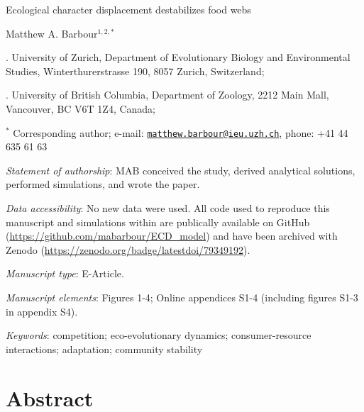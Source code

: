 \documentclass[11pt,]{article}
\author{}
\date{\vspace{-2.5em}}
\begin{document}
\vspace*{0.1cm}

\begin{center} \LARGE Ecological character displacement destabilizes food webs \end{center}

\bigskip 

\begin{center} \large Matthew A. Barbour$^{1,2,\ast}$ \normalsize \end{center}

\bigskip

. University of Zurich, Department of Evolutionary Biology
and Environmental Studies, Winterthurerstrasse 190, 8057 Zurich,
Switzerland;

. University of British Columbia, Department of Zoology, 2212
Main Mall, Vancouver, BC V6T 1Z4, Canada;

\(^\ast\) Corresponding author; e-mail:
\href{mailto:matthew.barbour@ieu.uzh.ch}{\nolinkurl{matthew.barbour@ieu.uzh.ch}},
phone: +41 44 635 61 63

\bigskip

\emph{Statement of authorship}: MAB conceived the study, derived
analytical solutions, performed simulations, and wrote the paper.

\bigskip

\emph{Data accessibility}: No new data were used. All code used to
reproduce this manuscript and simulations within are publically
available on GitHub (\url{https://github.com/mabarbour/ECD_model}) and
have been archived with Zenodo
(\url{https://zenodo.org/badge/latestdoi/79349192}).

\bigskip

\bigskip

\emph{Manuscript type}: E-Article.

\bigskip

\emph{Manuscript elements}: Figures 1-4; Online appendices S1-4
(including figures S1-3 in appendix S4).

\bigskip

\emph{Keywords}: competition; eco-evolutionary dynamics;
consumer-resource interactions; adaptation; community stability

\linenumbers{} \modulolinenumbers[2]

\section{Abstract}\label{abstract}
\end{document}
